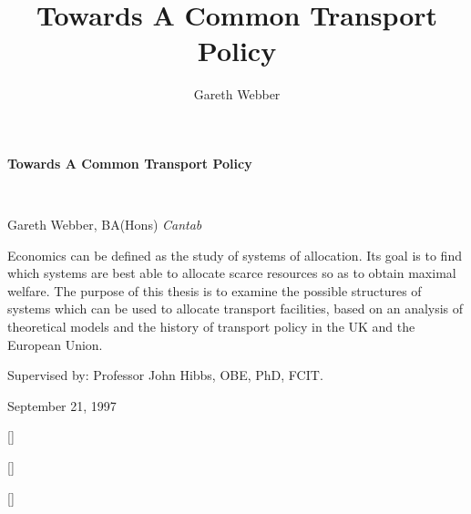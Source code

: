 \documentclass[11pt]{report}
\begin{document}
\begin{titlepage}
\pagecolor{titlepagecolor}\color{white}
{\noindent \titlefont \LARGE \bfseries Towards A Common Transport Policy}\title{Towards A Common Transport Policy}\\
\makebox[0pt][l]{\rule{1.3\textwidth}{2pt}}
\par {\noindent \titlefont \textcolor{namecolor}{Gareth Webber, BA(Hons) \textit{Cantab}}}\author{Gareth Webber}
\vskip 3cm
{\noindent Economics can be defined as the study of systems of allocation. Its goal is to find which systems are best able to allocate scarce resources so as to obtain maximal welfare. The purpose of this thesis is to examine the possible structures of systems which can be used to allocate transport facilities, based on an analysis of theoretical models and the history of transport policy in the UK and the European Union.}
\par {\noindent  \textcolor{namecolor}{Supervised by: Professor John Hibbs, OBE, PhD, FCIT.}}
\par {\noindent  \textcolor{namecolor}{September 21, 1997}}
\end{titlepage}
\restoregeometry 
\pagecolor{white}

\titleformat{\chapter}[block]{\Huge\titlefont\bfseries}{\thechapter}{0ex}{\centering} []
\tableofcontents
\listoftables
\listoffigures

\titleformat{\chapter}[block]{\Huge\titlefont\bfseries}{\centering\thechapter\vskip -10pt}{0ex}{\centering\rule{0.3\textwidth}{2pt}\vskip 0pt\centering} []

	
		





\titleformat{\chapter}[block]{\Huge\titlefont\bfseries}{\thechapter}{0ex}{\centering} []


\end{document}
